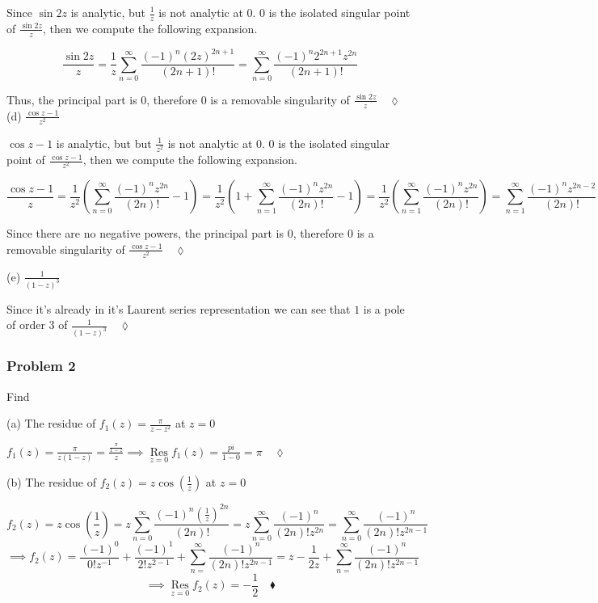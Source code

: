 \documentclass{article}
\def\res{\mathop{\text{Res}}\limits}
\begin{document}
Since $\sin 2z$ is analytic, but $\frac{1}{z}$ is not analytic at
$0$. $0$ is the isolated singular point of $\frac{\sin 2z}{z}$, then
we compute the following expansion.

\[\frac{\sin 2z}{z} = \frac{1}{z}\sum_{n=0}^\infty
\frac{(-1)^n(2z)^{2n+1}}{(2n+1)!} = \sum_{n=0}^\infty
\frac{(-1)^n2^{2n+1}z^{2n}}{(2n+1)!}\]

Thus, the principal part is $0$, therefore $0$ is a removable
singularity of $\frac{\sin 2z}{z}\quad \lozenge$
\newpage
(d) $\frac{\cos z -1}{z^2}$


$\cos z -1$ is analytic, but but $\frac{1}{z^2}$ is not analytic at
$0$. $0$ is the isolated singular point of $\frac{\cos z -1}{z^2}$, then
we compute the following expansion.

\[\frac{\cos z -1}{z} = \frac{1}{z^2}\left( \sum_{n=0}^\infty
\frac{(-1)^nz^{2n}}{(2n)!} -1\right) = \frac{1}{z^2}\left( 1+ \sum_{n=1}^\infty
\frac{(-1)^nz^{2n}}{(2n)!} -1\right) = \frac{1}{z^2}\left(\sum_{n=1}^\infty
\frac{(-1)^nz^{2n}}{(2n)!}\right) = \sum_{n=1}^\infty
\frac{(-1)^nz^{2n-2}}{(2n)!}\]

Since there are no negative powers, the principal part is $0$, therefore $0$ is a removable
singularity of $\frac{\cos z -1}{z^2}\quad \lozenge$

(e) $\frac{1}{(1-z)^3}$

Since it's already in it's Laurent series representation we can see
that $1$ is a pole of order $3$ of $\frac{1}{(1-z)^3}\quad \lozenge$

\subsubsection*{Problem 2} Find

(a) The residue of $f_1(z) = \frac{\pi}{z-z^2}$ at $z=0$

 $f_1(z) = \frac{\pi}{z(1-z)} = \frac{\frac{\pi}{1-z}}{z}
\implies \res_{z=0}f_1(z) = \frac{pi}{1-0} = \pi\quad \lozenge$

(b) The residue of $f_2(z) = z\cos\left( \frac{1}{z} \right)$ at $z=0$

\[f_2(z) = z\cos\left( \frac{1}{z} \right) = z\sum_{n=0}^{\infty}
  \frac{(-1)^n\left( \frac{1}{z} \right)^{2n}}{(2n)!}  = z\sum_{n=0}^{\infty}
  \frac{(-1)^n}{(2n)!z^{2n}}= \sum_{n=0}^{\infty}
  \frac{(-1)^n}{(2n)!z^{2n-1}}\]
\[\implies f_2(z) =\frac{(-1)^0}{0! z^{-1}} + \frac{(-1)^1}{2! z^{2-1}}+ \sum_{n=}^{\infty}
  \frac{(-1)^n}{(2n)!z^{2n-1}} = z - \frac{1}{2z}+ \sum_{n=}^{\infty}
  \frac{(-1)^n}{(2n)!z^{2n-1}}\]
\[\implies \res_{z=0}f_2(z) = -\frac{1}{2} \quad \blacklozenge\]
\end{document}

